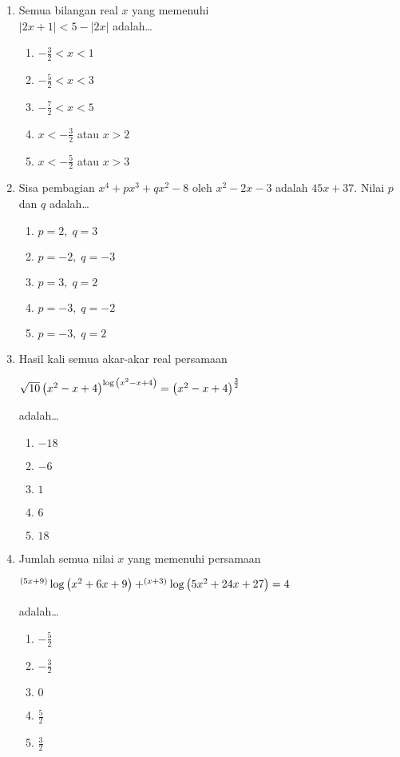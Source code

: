 \documentclass[A4,12PT, english, twocolumn]{journal}
\begin{document}
\begin{enumerate}
\item Semua bilangan real $x$ yang memenuhi \\ $\left|2x+1 \right|<5-\left|2x \right|$ adalah\dots
    \begin{enumerate}
        \item $-\frac{3}{2}<x<1$
        \item $-\frac{5}{2}<x<3$
        \item $-\frac{7}{2}<x<5$
        \item $x<-\frac{3}{2}$ atau $x>2$
        \item $x<-\frac{5}{2}$ atau $x>3$
    \end{enumerate}

\item Sisa pembagian $x^4+px^3+qx^2-8$ oleh $x^2-2x-3$ adalah $45x+37$. Nilai $p$ dan $q$ adalah\dots
    \begin{enumerate}
        \item $p=2, \; q=3$
        \item $p=-2, \; q=-3$
        \item $p=3, \; q=2$
        \item $p=-3, \; q=-2$
        \item $p=-3, \; q=2$
    \end{enumerate}

\item Hasil kali semua akar-akar real persamaan
\begin{center}
    $\sqrt{10}\left(x^2-x+4 \right)^{\Log{\left(x^2-x+4 \right)}}=\left(x^2-x+4 \right)^{\frac{3}{2}}$
\end{center}
adalah\dots
    \begin{enumerate}
        \item $-18$
        \item $-6$
        \item $1$
        \item $6$
        \item $18$
    \end{enumerate}

\item Jumlah semua nilai $x$ yang memenuhi persamaan
\begin{center}
    \small$^{(5x+9)}\Log{\left(x^2+6x+9\right)}+^{(x+3)}\Log{\left(5x^2+24x+27 \right)}=4$
\end{center}
adalah\dots
    \begin{enumerate}
        \item $-\frac{5}{2}$
        \item $-\frac{3}{2}$
        \item $0$
        \item $\frac{5}{2}$
        \item $\frac{3}{2}$
    \end{enumerate}


\end{enumerate}
\end{document}
